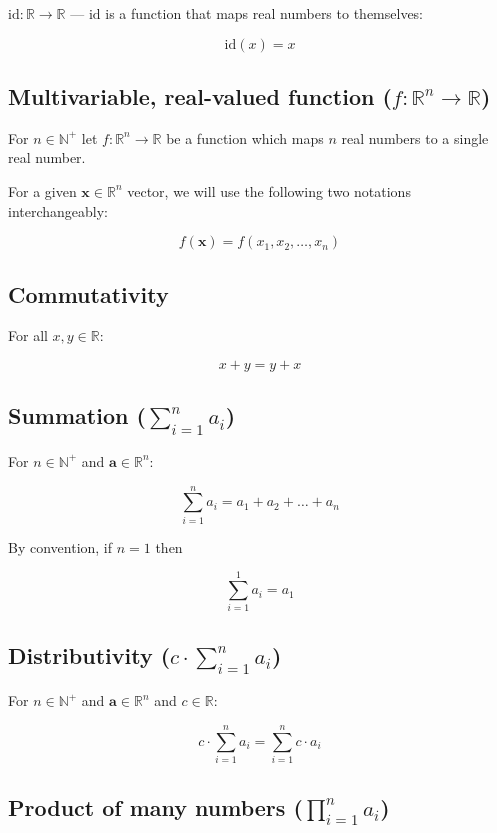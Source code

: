\documentclass{article}
\begin{document}
        $\text{id} : \mathbb{R} \rightarrow \mathbb{R}$ --- $\text{id}$ is a
        function that maps real numbers to themselves:

        $$\text{id}(x) = x$$

      \subsection{%
        Multivariable, real-valued function
        ($f : \mathbb{R}^n \rightarrow \mathbb{R}$)
      }

        For $n \in \mathbb{N}^+$ let $f : \mathbb{R}^n \rightarrow \mathbb{R}$
        be a function which maps $n$ real numbers to a single real number.

        For a given $\mathbf{x} \in \mathbb{R}^n$ vector, we will use the
        following two notations interchangeably:

        $$f(\mathbf{x}) = f(x_1, x_2, \ldots, x_n)$$

      \subsection{Commutativity}

        For all $x, y \in \mathbb{R}$:

        $$x + y = y + x$$

      \subsection{Summation ($\sum_{i=1}^n a_i$)}

        For $n \in \mathbb{N}^+$ and $\mathbf{a} \in \mathbb{R}^n$:

        $$\sum_{i=1}^n a_i = a_1 + a_2 + \ldots + a_n$$

        By convention, if $n=1$ then

        $$\sum_{i=1}^1 a_i = a_1$$

      \subsection{Distributivity ($c \cdot \sum_{i=1}^n a_i$)}

        For $n \in \mathbb{N}^+$ and $\mathbf{a} \in \mathbb{R}^n$ and
        $c \in \mathbb{R}$:

        $$c \cdot \sum_{i=1}^n a_i = \sum_{i=1}^n c \cdot a_i$$

      \subsection{Product of many numbers ($\prod_{i=1}^n a_i$)}
\end{document}
